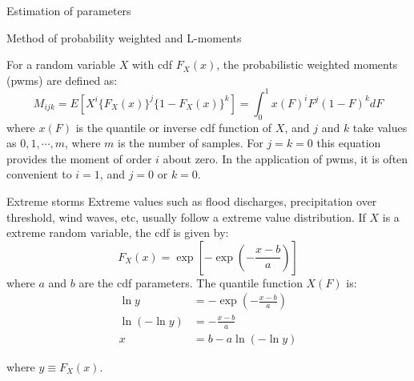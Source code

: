 \documentclass[8pt]{beamer}
\renewcommand{\emph}[1]{\textcolor{myorange}{#1}}
\begin{document}
\begin{frame}{Estimation of parameters}

    \begin{block}{Method of probability weighted and L-moments}

        For a random variable $X$ with \emph{cdf} $F_X (x)$, the \alert{probabilistic weighted moments (pwms)} are defined as:
        \[
            M_{ijk} = E \left[ X^i \{F_X (x)\}^j \{1 - F_X (x) \}^k \right] = \int_0^1 {x(F)}^i F^j (1 - F)^k dF
        \]
        where $x(F)$ is the quantile or inverse \emph{cdf} function of $X$, and $j$ and $k$ take values as  $0, 1, \cdots, m$, where $m$ is the number of samples. For $j=k=0$ this equation provides the moment of order $i$ about zero. In the application of \emph{pwms}, it is often convenient to $i=1$, and $j=0$ or $k=0$. 
    \end{block}
        \vspace{-6pt}
    \begin{exampleblock}{Extreme storms}
        Extreme values such as flood discharges, precipitation over threshold, wind waves, etc, usually follow a \emph{extreme value distribution}. If $X$ is a extreme random variable, the \emph{cdf} is given by:
        \vspace{-5pt}
        \[
            F_X (x) = \exp \left[ -\exp\left( - \frac{x-b}{a}\right)\right]
        \]
        \vspace{-5pt}
        where $a$ and $b$ are the \emph{cdf} parameters. The quantile function $X(F)$ is:
        \begin{align*}
            \ln y &= -\exp\left( - \frac{x-b}{a}\right) \\
            \ln( -\ln y) &= -\frac{x-b}{a} \\
            x &= b - a\ln( -\ln y)
        \end{align*}

        \vspace{-5pt}

        where $y\equiv F_X (x)$. 
    \end{exampleblock}

\end{frame}
\end{document}
